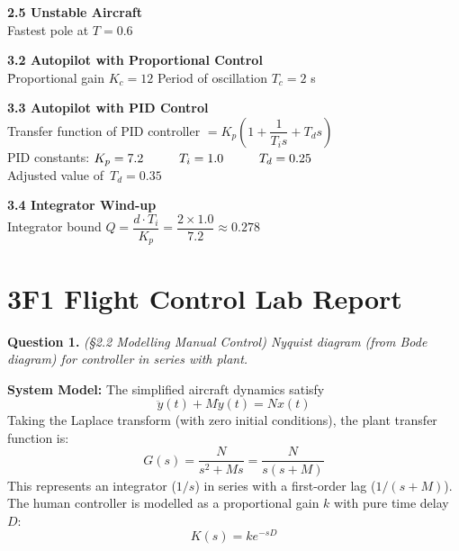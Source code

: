 \documentclass[fleqn,12pt,a4paper,twoside]{article}
\begin{document}
\begin{tabbing}
        \textbf{2.5 Unstable Aircraft}\\
        Fastest pole at $T= 0.6$\\
\end{tabbing}

\begin{tabbing}
        \textbf{3.2 Autopilot with Proportional Control}\\
        \= Proportional gain $K_c= 12$ \hspace*{2cm} Period of oscillation $T_c= 2$ s\\
\end{tabbing}

\begin{tabbing}
        \textbf{3.3 Autopilot with PID Control}\\[3mm]
        Transfer function of PID controller $= K_p \left(1 + \dfrac{1}{T_i s} + T_d s\right)$\\
        PID constants: $K_p = 7.2 \hspace*{1cm} T_i = 1.0 \hspace*{1cm} T_d = 0.25$\\
        Adjusted value of \,$T_d = 0.35$\\
\end{tabbing}

\begin{tabbing}
        \textbf{3.4 Integrator Wind-up}\\
        Integrator bound $Q= \dfrac{d \cdot T_i}{K_p} = \dfrac{2 \times 1.0}{7.2} \approx 0.278$\\
\end{tabbing}

\pagebreak

\section*{3F1 Flight Control Lab Report}

\textbf{Question 1.} \textit{(§2.2 Modelling Manual Control) Nyquist diagram (from Bode diagram) for controller in series with plant.}

\vspace{1em}

\textbf{System Model:} The simplified aircraft dynamics satisfy
$$ \ddot{y}(t) + M\dot{y}(t) = Nx(t) $$
Taking the Laplace transform (with zero initial conditions), the plant transfer function is:
$$ G(s) = \frac{N}{s^2 + Ms} = \frac{N}{s(s+M)} $$
This represents an integrator ($1/s$) in series with a first-order lag ($1/(s+M)$). The human controller is modelled as a proportional gain $k$ with pure time delay $D$:
$$ K(s) = ke^{-sD} $$
\end{document}
